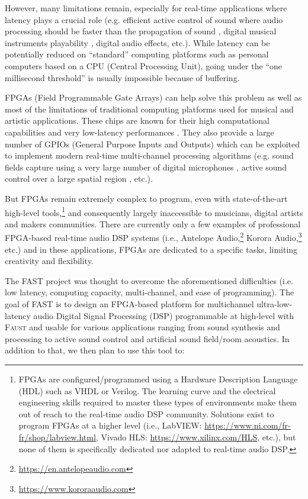 \documentclass[a4paper,10pt]{article}
\newcommand{\F}{\textsc{Faust}}
\newcommand{\PP}{FAST}
\begin{document}
However, many limitations remain, especially for real-time applications where latency plays a crucial role (e.g. efficient active control of sound where audio processing should be faster than the propagation of sound \cite{elliott2000signal}, digital musical instruments playability \cite{Lago2004}, digital audio effects, etc.). While latency can be potentially reduced on ``standard'' computing platforms such as personal computers based on a CPU (Central Processing Unit), going under the ``one millisecond threshold'' is usually impossible because of buffering.

FPGAs (Field Programmable Gate Arrays) can help solve this problem as well as most of the limitations of traditional computing platforms used for musical and artistic applications. These chips are known for their high computational capabilities \cite{Choi2013,Pfeifle2012} and very low-latency performances \cite{Verstraelen2014}. They also provide a large number of GPIOs (General Purpose Inputs and Outputs) which can be exploited to implement modern real-time multi-channel processing algorithms (e.g. sound fields capture using a very large number of digital microphones \cite{salze2019new}, active sound control over a large spatial region \cite{Zhang2018}, etc.). 

But FPGAs remain extremely complex to program, even with state-of-the-art high-level tools,\footnote{FPGAs are configured/programmed using a Hardware Description Language (HDL) such as VHDL or Verilog. The learning curve and the electrical engineering skills required to master these types of environments make them out of reach to the real-time audio DSP community. Solutions exist to program FPGAs at a higher level (i.e., LabVIEW: \url{https://www.ni.com/fr-fr/shop/labview.html}, Vivado HLS: \url{https://www.xilinx.com/HLS}, etc.), but none of them is specifically dedicated nor adapted to real-time audio DSP.} and consequently largely inaccessible to musicians, digital artists and makers communities.
There are currently only a few examples of professional FPGA-based real-time audio DSP systems (i.e., Antelope Audio,\footnote{\url{https://en.antelopeaudio.com}} Korora Audio,\footnote{\url{https://www.kororaaudio.com}} etc.) and in these applications, FPGAs are dedicated to a specific tasks, limiting creativity and flexibility.

The \PP{} project was thought to overcome the aforementioned difficulties (i.e. low latency, computing capacity, multi-channel, and ease of programming). The goal of \PP{} is to design an FPGA-based platform for multichannel ultra-low-latency audio Digital Signal Processing (DSP) programmable at high-level with \F{} and usable for various applications ranging from sound synthesis and processing to active sound control and artificial sound field/room acoustics. In addition to that, we then plan to use this tool to: 
\end{document}
